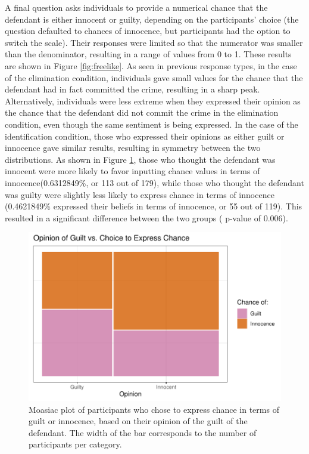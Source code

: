 \documentclass[print]{nuthesis}
\begin{document}
A final question asks individuals to provide a numerical chance that the defendant is either innocent or guilty, depending on the participants' choice (the question defaulted to chances of innocence, but participants had the option to switch the scale).
Their responses were limited so that the numerator was smaller than the denominator, resulting in a range of values from 0 to 1.
These results are shown in Figure \ref{fig:freelike}.
As seen in previous response types, in the case of the elimination condition, individuals gave small values for the chance that the defendant had in fact committed the crime, resulting in a sharp peak.
Alternatively, individuals were less extreme when they expressed their opinion as the chance that the defendant did not commit the crime in the elimination condition, even though the same sentiment is being expressed.
In the case of the identification condition, those who expressed their opinions as either guilt or innocence gave similar results, resulting in symmetry between the two distributions.
As shown in Figure \ref{fig:opinionchanceplot}, those who thought the defendant was innocent were more likely to favor inputting chance values in terms of innocence(0.6312849\%, or 113 out of 179), while those who thought the defendant was guilty were slightly less likely to express chance in terms of innocence (0.4621849\% expressed their beliefs in terms of innocence, or 55 out of 119).
This resulted in a significant difference between the two groups ( p-value of 0.006).

\begin{figure}

{\centering \includegraphics[width=\linewidth]{thesis_files/figure-latex/opinionchanceplot-1} 

}

\caption{Moasiac plot of participants who chose to express chance in terms of guilt or innocence, based on their opinion of the guilt of the defendant. The width of the bar corresponds to the number of participants per category.}\label{fig:opinionchanceplot}
\end{figure}
\end{document}
